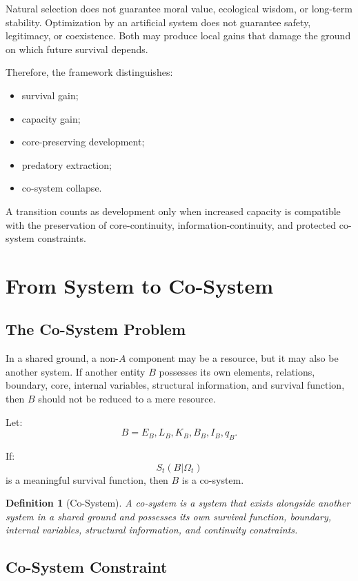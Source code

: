 \documentclass[11pt,a4paper]{article}
\newtheorem{definition}{Definition}
\begin{document}
Natural selection does not guarantee moral value, ecological wisdom, or long-term stability. Optimization by an artificial system does not guarantee safety, legitimacy, or coexistence. Both may produce local gains that damage the ground on which future survival depends.

Therefore, the framework distinguishes:
\begin{itemize}[leftmargin=2em]
\item survival gain;
\item capacity gain;
\item core-preserving development;
\item predatory extraction;
\item co-system collapse.
\end{itemize}

A transition counts as development only when increased capacity is compatible with the preservation of core-continuity, information-continuity, and protected co-system constraints.

\section{From System to Co-System}

\subsection{The Co-System Problem}

In a shared ground, a non-$A$ component may be a resource, but it may also be another system. If another entity $B$ possesses its own elements, relations, boundary, core, internal variables, structural information, and survival function, then $B$ should not be reduced to a mere resource.

Let:
\[
B={E_B,L_B,K_B,B_B,I_B,q_B}.
\]

If:
\[
S_t(B|\Omega_t)
\]
is a meaningful survival function, then $B$ is a co-system.

\begin{definition}[Co-System]
A co-system is a system that exists alongside another system in a shared ground and possesses its own survival function, boundary, internal variables, structural information, and continuity constraints.
\end{definition}

\subsection{Co-System Constraint}
\end{document}
